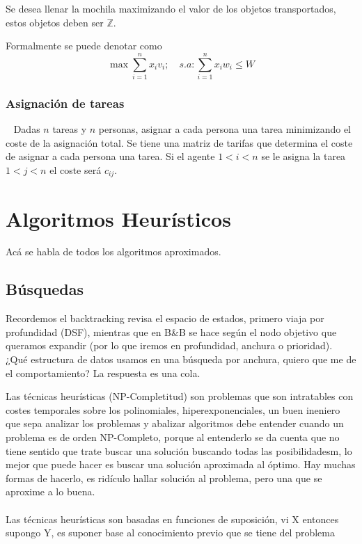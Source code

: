 \documentclass[tikz,11pt,fleqn]{book} %
\begin{document}
    Se desea llenar la mochila maximizando el valor de los objetos transportados, estos objetos deben ser $\mathbb Z$.
    
    Formalmente se puede denotar como
    $$ \max\sum_{i=1}^nx_iv_i;\quad s.a:\sum_{i=1}^nx_iw_i\le W $$



\subsection{Asignación de tareas}~
    Dadas $n$ tareas y $n$ personas, asignar a cada persona una tarea minimizando el coste de la asignación total.
    Se tiene una matriz de tarifas que determina el coste de asignar a cada persona una tarea.
    Si el agente $1<i<n$ se le asigna la tarea $1<j<n$ el coste será $c_{ij}$.
    



\chapter{Algoritmos Heurísticos}
Acá se habla de todos los algoritmos aproximados.

\section{Búsquedas}
Recordemos el backtracking revisa el espacio de estados, primero viaja por profundidad (DSF), mientras que en B\&B se hace según el nodo objetivo que queramos expandir (por lo que iremos en profundidad, anchura o prioridad). ¿Qué estructura de datos usamos en una búsqueda por anchura, quiero que me de el comportamiento? La respuesta es una cola.

\begin{definition}[Heurísticas]
    Las técnicas heurísticas (NP-Completitud) son problemas que son intratables con costes temporales sobre los polinomiales, hiperexponenciales, un buen ineniero que sepa analizar los problemas y abalizar algoritmos debe entender cuando un problema es de orden NP-Completo, porque al entenderlo se da cuenta que no tiene sentido que trate buscar una solución buscando todas las posibilidadesm, lo mejor que puede hacer es buscar una solución aproximada al óptimo. Hay muchas formas de hacerlo, es ridículo hallar solución al problema, pero una que se aproxime a lo buena.
    \\~\\
    Las técnicas heurísticas son basadas en funciones de suposición, vi X entonces supongo Y, es suponer base al conocimiento previo que se tiene del problema
\end{definition}
\end{document}
